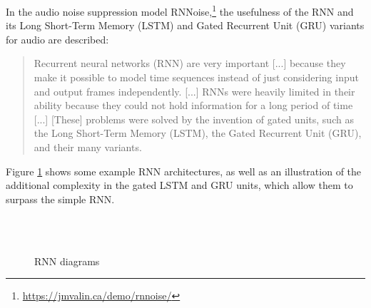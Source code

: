 \documentclass[report.tex]{subfiles}
\begin{document}
In the audio noise suppression model RNNoise,\footnote{\url{https://jmvalin.ca/demo/rnnoise/}} the usefulness of the RNN and its Long Short-Term Memory (LSTM) \parencite{lstm1} and Gated Recurrent Unit (GRU) \parencite{gru1} variants for audio are described:

\begin{quote}
	Recurrent neural networks (RNN) are very important [...] because they make it possible to model time sequences instead of just considering input and output frames independently. [...] RNNs were heavily limited in their ability because they could not hold information for a long period of time [...] [These] problems were solved by the invention of gated units, such as the Long Short-Term Memory (LSTM), the Gated Recurrent Unit (GRU), and their many variants.
\end{quote}

Figure \ref{fig:rnndiags} shows some example RNN architectures, as well as an illustration of the additional complexity in the gated LSTM and GRU units, which allow them to surpass the simple RNN.

\begin{figure}[ht]
	\centering
	\\
	\\
	\caption{RNN diagrams}
	\label{fig:rnndiags}
\end{figure}
\end{document}
